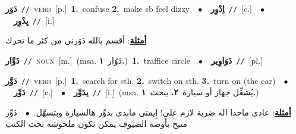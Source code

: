 \documentclass[10pt,a4paper,twoside]{article} %
\begin{document}
\begin{multicols}{2}
{\setlength\topsep{0pt}\textbf{\foreignlanguage{arabic}{دَوَر}}\ {\color{gray}\texttt{//}\color{black}}\ \textsc{verb}\ [p.]\ \textbf{1.}~confuse  \textbf{2.}~make sb feel dizzy\ \ $\bullet$\ \ \setlength\topsep{0pt}\textbf{\foreignlanguage{arabic}{اِدْوِر}}\ {\color{gray}\texttt{//}\color{black}}\ [c.]\ \ $\bullet$\ \ \setlength\topsep{0pt}\textbf{\foreignlanguage{arabic}{يِدْوِر}}\ {\color{gray}\texttt{//}\color{black}}\ [i.]\  \begin{flushright}\color{gray}\foreignlanguage{arabic}{\textbf{\underline{\foreignlanguage{arabic}{أمثلة}}}: أقسم بالله دَوَرني من كثر ما تحرك}\end{flushright}\color{black}} \vspace{2mm}

{\setlength\topsep{0pt}\textbf{\foreignlanguage{arabic}{دَوَّار}}\ {\color{gray}\texttt{//}\color{black}}\ \textsc{noun}\ [m.]\ \color{gray}(msa. \foreignlanguage{arabic}{دَوّار}~\foreignlanguage{arabic}{\textbf{١.}})\color{black}\ \textbf{1.}~traffice circle\ \ $\bullet$\ \ \setlength\topsep{0pt}\textbf{\foreignlanguage{arabic}{دَوَاوِير}}\ {\color{gray}\texttt{//}\color{black}}\ [pl.]\ } \vspace{2mm}

{\setlength\topsep{0pt}\textbf{\foreignlanguage{arabic}{دَوَّر}}\ {\color{gray}\texttt{//}\color{black}}\ \textsc{verb}\ [p.]\ \textbf{1.}~search for sth.  \textbf{2.}~switch on sth.  \textbf{3.}~turn on (the car)\ \ $\bullet$\ \ \setlength\topsep{0pt}\textbf{\foreignlanguage{arabic}{دَوِّر}}\ {\color{gray}\texttt{//}\color{black}}\ [c.]\ \ $\bullet$\ \ \setlength\topsep{0pt}\textbf{\foreignlanguage{arabic}{يدَوِّر}}\ {\color{gray}\texttt{//}\color{black}}\ [i.]\ \color{gray}(msa. \foreignlanguage{arabic}{يُشغِّل جهاز أو سيارة}~\foreignlanguage{arabic}{\textbf{٢.}}  \foreignlanguage{arabic}{يبحث}~\foreignlanguage{arabic}{\textbf{١.}})\color{black}\  \begin{flushright}\color{gray}\foreignlanguage{arabic}{\textbf{\underline{\foreignlanguage{arabic}{أمثلة}}}: عادي ماحدا اله ضربة لازم علي! إِيمتى مابدي بدوِّر هالسيارة وبتسهَّل.\ $\bullet$\ \  دَوِّر منيح بأوضة الضيوف يمكن تكون ملحوشة تحت الكنب}\end{flushright}\color{black}} \vspace{2mm}


\end{multicols}
\end{document}
